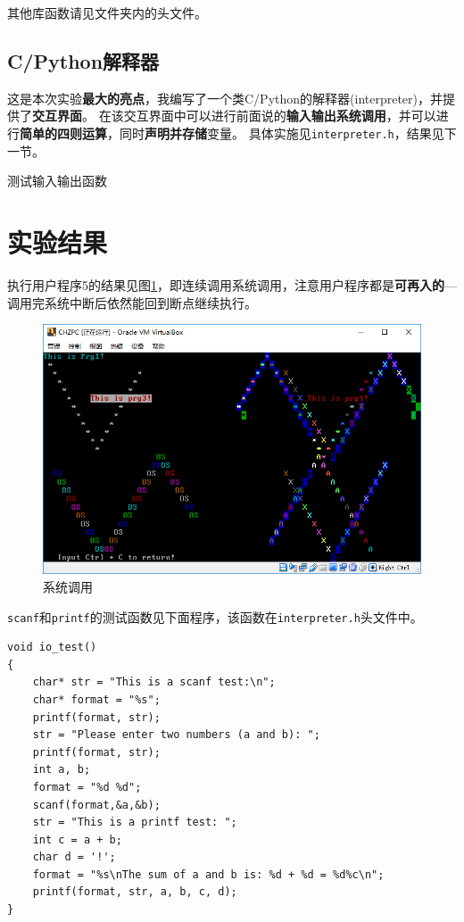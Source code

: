 \documentclass[logo,reportComp]{thesis}
\begin{document}
其他库函数请见\verb''文件夹内的头文件。

\subsection{C/Python解释器}
这是本次实验\textbf{最大的亮点}，我编写了一个类C/Python的解释器(interpreter)，并提供了\textbf{交互界面}。
在该交互界面中可以进行前面说的\textbf{输入输出系统调用}，并可以进行\textbf{简单的四则运算}，同时\textbf{声明并存储}变量。
具体实施见\verb'interpreter.h'，结果见下一节。

测试输入输出函数

\section{实验结果}
执行用户程序5的结果见图\ref{fig:system}，即连续调用系统调用，注意用户程序都是\textbf{可再入的}---调用完系统中断后依然能回到断点继续执行。
\begin{figure}[H]
\centering
\includegraphics[width=0.8\linewidth]{fig/system.PNG}
\caption{系统调用}
\label{fig:system}
\end{figure}

\verb'scanf'和\verb'printf'的测试函数见下面程序，该函数在\verb'interpreter.h'头文件中。
\begin{lstlisting}
void io_test()
{
	char* str = "This is a scanf test:\n";
	char* format = "%s";
	printf(format, str);
	str = "Please enter two numbers (a and b): ";
	printf(format, str);
	int a, b;
	format = "%d %d";
	scanf(format,&a,&b);
	str = "This is a printf test: ";
	int c = a + b;
	char d = '!';
	format = "%s\nThe sum of a and b is: %d + %d = %d%c\n";
	printf(format, str, a, b, c, d);
}
\end{lstlisting}
\end{document}
